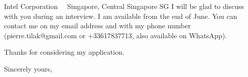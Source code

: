 \documentclass{scrlttr2}
\renewcommand{\\}{\ {\large\textperiodcentered}\ }
\begin{document}
\begin{letter}{ %
Intel Corporation\\
Singapore, Central Singapore SG
}
I will be glad to discuss with you during an interview. I am available from the
	end of June. You can contact me on my email address and with my phone
	number (pierre.tilak@gmail.com or +33617837713, also available on WhatsApp).

Thanks for considering my application.

%
%
%
%
Sincerely yours, \\ \\ \\


\end{letter}
\end{document}
